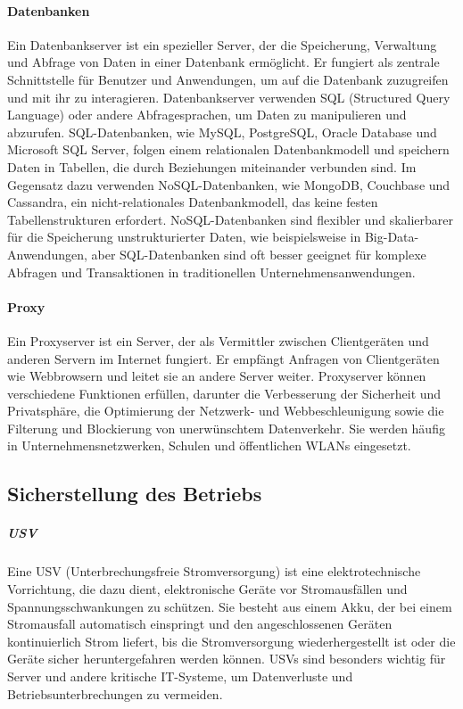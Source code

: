 \paragraph{Datenbanken}

Ein Datenbankserver ist ein spezieller Server, der die Speicherung, Verwaltung und Abfrage von Daten in einer Datenbank ermöglicht. Er fungiert als zentrale Schnittstelle für Benutzer und Anwendungen, um auf die Datenbank zuzugreifen und mit ihr zu interagieren. Datenbankserver verwenden SQL (Structured Query Language) oder andere Abfragesprachen, um Daten zu manipulieren und abzurufen. SQL-Datenbanken, wie MySQL, PostgreSQL, Oracle Database und Microsoft SQL Server, folgen einem relationalen Datenbankmodell und speichern Daten in Tabellen, die durch Beziehungen miteinander verbunden sind. Im Gegensatz dazu verwenden NoSQL-Datenbanken, wie MongoDB, Couchbase und Cassandra, ein nicht-relationales Datenbankmodell, das keine festen Tabellenstrukturen erfordert. NoSQL-Datenbanken sind flexibler und skalierbarer für die Speicherung unstrukturierter Daten, wie beispielsweise in Big-Data-Anwendungen, aber SQL-Datenbanken sind oft besser geeignet für komplexe Abfragen und Transaktionen in traditionellen Unternehmensanwendungen.

\paragraph{Proxy}

Ein Proxyserver ist ein Server, der als Vermittler zwischen Clientgeräten und anderen Servern im Internet fungiert. Er empfängt Anfragen von Clientgeräten wie Webbrowsern und leitet sie an andere Server weiter. Proxyserver können verschiedene Funktionen erfüllen, darunter die Verbesserung der Sicherheit und Privatsphäre, die Optimierung der Netzwerk- und Webbeschleunigung sowie die Filterung und Blockierung von unerwünschtem Datenverkehr. Sie werden häufig in Unternehmensnetzwerken, Schulen und öffentlichen WLANs eingesetzt.

\subsection{Sicherstellung des Betriebs}

\subparagraph{USV}

Eine USV (Unterbrechungsfreie Stromversorgung) ist eine elektrotechnische Vorrichtung, die dazu dient, elektronische Geräte vor Stromausfällen und Spannungsschwankungen zu schützen. Sie besteht aus einem Akku, der bei einem Stromausfall automatisch einspringt und den angeschlossenen Geräten kontinuierlich Strom liefert, bis die Stromversorgung wiederhergestellt ist oder die Geräte sicher heruntergefahren werden können. USVs sind besonders wichtig für Server und andere kritische IT-Systeme, um Datenverluste und Betriebsunterbrechungen zu vermeiden.


